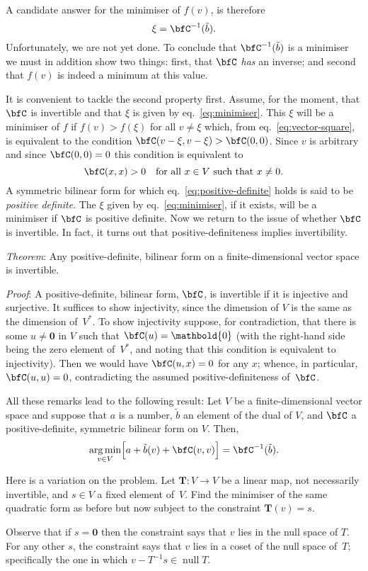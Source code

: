\documentclass[10pt, a4paper]{article}
\newcommand{\bzero}{\mathbold{0}} %
\DeclareMathOperator*{\argmin}{arg\,min}
\DeclareMathOperator{\nullspace}{null}
\begin{document}
A candidate answer for the minimiser of $f(v)$, is therefore
\begin{equation}
  \label{eq:minimiser}
  \xi = \bfC^{-1}(\tilde{b}).
\end{equation}
Unfortunately, we are not yet done. To conclude that
$\bfC^{-1}(\tilde{b})$ is a minimiser we must in addition show two
things: first, that $\bfC$ \emph{has} an inverse; and second that
$f(v)$ is indeed a minimum at this value.

It is convenient to tackle the second property first. Assume, for the
moment, that $\bfC$ is invertible and that $\xi$ is given by
eq.~\eqref{eq:minimiser}. This $\xi$ will be a minimiser of $f$ if
$f(v)>f(\xi)$ for all $v \neq \xi$ which, from eq.~\eqref{eq:vector-square},
is equivalent to the condition $\bfC(v-\xi,v-\xi)>\bfC(0,0)$. Since
$v$ is arbitrary and since $\bfC(0,0)=0$ this condition is equivalent
to
\begin{equation}
  \label{eq:positive-definite}
  \bfC(x,x) > 0 \quad\text{for all $x\in V$ such that $x\neq0$}.
\end{equation}
A symmetric bilinear form for which eq.~\eqref{eq:positive-definite}
holds is said to be \emph{positive definite}. The $\xi$ given by
eq.~\eqref{eq:minimiser}, if it exists, will be a minimiser if $\bfC$
is positive definite. Now we return to the issue of whether $\bfC$ is
invertible. In fact, it turns out that positive-definiteness implies
invertibility.

\emph{Theorem}: Any positive-definite, bilinear form on a
finite-dimensional vector space is invertible.

\emph{Proof}: A positive-definite, bilinear form, $\bfC$, is
invertible if it is injective and surjective. It suffices to show
injectivity, since the dimension of $V$ is the same as the dimension
of~$V^*$. To show injectivity suppose, for contradiction, that there
is some $u\neq\bzero$ in $V$ such that $\bfC(u)=\bzero$ (with the
right-hand side being the zero element of~$V^*$, and noting that this
condition is equivalent to injectivity). Then we would have
$\bfC(u, x) = 0$ for any $x$; whence, in particular, $\bfC(u,u)=0$,
contradicting the assumed positive-definiteness of~$\bfC$.

All these remarks lead to the following result: Let $V$ be a
finite-dimensional vector space and suppose that $a$ is a number,
$\tilde{b}$ an element of the dual of $V$, and $\bfC$ a
positive-definite, symmetric bilinear form on $V$. Then,
\[
  \argmin_{v\in V} \Bigl[a +\tilde{b}(v) + \bfC(v,v) \Bigr] = \bfC^{-1}(\tilde{b}). 
\]

Here is a variation on the problem. Let $\bm{T}:V\to V$ be a linear map,
not necessarily invertible, and $s\in V$ a fixed element of~$V$. Find
the minimiser of the same quadratic form as before but now subject to
the constraint $\bm{T}(v)= s$.

Observe that if $s=\bzero$ then the constraint says that $v$ lies in
the null space of $T$. For any other $s$, the constraint says that $v$
lies in a coset of the null space of~$T$; specifically the one in
which $v-T^{-1}s\in\nullspace T$. 
\end{document}
